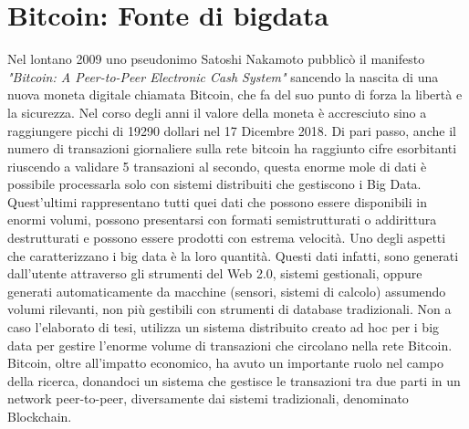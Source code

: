 \chapter{Bitcoin: Fonte di bigdata}
\label{chap:bitcoin fonte di bigdata}

Nel lontano 2009 uno pseudonimo Satoshi Nakamoto pubblicò il manifesto \textit{"Bitcoin: A Peer-to-Peer Electronic Cash System"}\cite{bitcoin:white-paper} sancendo la nascita di una nuova moneta digitale chiamata Bitcoin, che fa  del suo punto di forza la libertà e la sicurezza. Nel corso degli anni il valore della moneta è accresciuto sino a raggiungere picchi di 19290 dollari nel 17 Dicembre 2018\cite{blockchain.com:valueOf}. Di pari passo, anche il numero di transazioni giornaliere sulla rete bitcoin ha raggiunto cifre esorbitanti riuscendo a validare 5 transazioni al secondo\cite{blockchain.com:transactions}, questa enorme mole di dati è possibile processarla solo con sistemi distribuiti che gestiscono i Big Data. Quest'ultimi rappresentano tutti quei dati che possono essere disponibili in enormi volumi, possono presentarsi con formati semistrutturati o addirittura destrutturati e possono essere prodotti con estrema velocità. Uno degli aspetti che caratterizzano i big data è la loro quantità. Questi dati infatti, sono generati dall'utente attraverso gli strumenti del Web 2.0, sistemi gestionali, oppure generati automaticamente da macchine (sensori, sistemi di calcolo) assumendo volumi rilevanti, non più gestibili con strumenti di database tradizionali. Non a caso l'elaborato di tesi, utilizza un sistema distribuito creato ad hoc per i big data per gestire l'enorme volume di transazioni che circolano nella rete Bitcoin.
\\Bitcoin, oltre all'impatto economico, ha avuto un importante ruolo nel campo della ricerca, donandoci un sistema che gestisce le transazioni tra due parti in un network peer-to-peer, diversamente dai sistemi tradizionali, denominato Blockchain.




